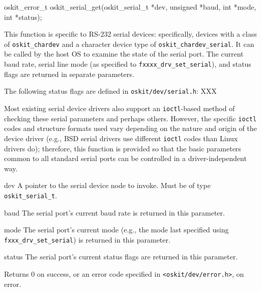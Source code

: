 {
\begin{apisyn}

	\funcproto oskit_error_t
	oskit_serial_get(oskit_serial_t *dev, \outparam unsigned *baud,
			    \outparam int *mode, \outparam int *status);
\end{apisyn}
\begin{apidesc}
	This function is specific to RS-232 serial devices:
	specifically, devices with a class of {\tt oskit_chardev}
	and a character device type of {\tt oskit_chardev_serial}.
	It can be called by the host OS
	to examine the state of the serial port.
	The current baud rate, serial line mode
	(as specified to {\tt fxxxx_drv_set_serial}),
	and status flags are returned in separate parameters.

	The following status flags are defined in {\tt oskit/dev/serial.h}:
	XXX

	Most existing serial device drivers also support
	an {\tt ioctl}-based method of checking
	these serial parameters and perhaps others.
	However, the specific {\tt ioctl} codes and structure formats used
	vary depending on the nature and origin of the device driver
	(e.g., BSD serial drivers use different {\tt ioctl} codes
	than Linux drivers do);
	therefore, this function is provided 
	so that the basic parameters common to all standard serial ports
	can be controlled in a driver-independent way.
\end{apidesc}
\begin{apiparm}
	\item[dev]
		A pointer to the serial device node to invoke.
		Must be of type {\tt oskit_serial_t}.
	\item[baud]
		The serial port's current baud rate is returned
		in this parameter.
	\item[mode]
		The serial port's current mode
		(e.g., the mode last specified using {\tt fxxx_drv_set_serial})
		is returned in this parameter.
	\item[status]
		The serial port's current status flags
		are returned in this parameter.
\end{apiparm}
\begin{apiret}
	Returns 0 on success, or an error code specified in
	{\tt <oskit/dev/error.h>}, on error.
\end{apiret}
}%



